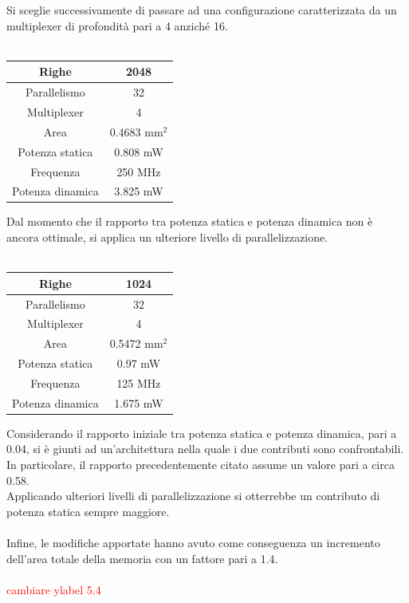 \documentclass[11pt,  english, makeidx, a4paper, titlepage, oneside]{book}
\begin{document}
\vspace{0.3cm}
Si sceglie successivamente di passare ad una configurazione caratterizzata da un multiplexer di profondità pari a 4 anziché 16.
\\\\
\begin{center}
	\begin{tabular}{|c|c|}
	\hline
	Righe & 2048\\
	\hline
	Parallelismo & 32\\
	\hline
	Multiplexer & 4\\
	\hline
	Area & 0.4683 mm$^2$\\
	\hline
	Potenza statica & 0.808 mW\\
	\hline
	Frequenza & 250 MHz\\
	\hline
	Potenza dinamica & 3.825 mW\\
	\hline
	\end{tabular}	
\end{center}
\vspace{0.3cm}
Dal momento che il rapporto tra potenza statica e potenza dinamica non è ancora ottimale, si applica un ulteriore livello di parallelizzazione.
\\\\
\begin{center}
	\begin{tabular}{|c|c|}
	\hline
	Righe & 1024\\
	\hline
	Parallelismo & 32\\
	\hline
	Multiplexer & 4\\
	\hline
	Area & 0.5472 mm$^2$\\
	\hline
	Potenza statica & 0.97 mW\\
	\hline
	Frequenza & 125 MHz\\
	\hline
	Potenza dinamica & 1.675 mW\\
	\hline
	\end{tabular}	
\end{center}
\vspace{0.3cm}
Considerando il rapporto iniziale tra potenza statica e potenza dinamica, pari a 0.04, si è giunti ad un'architettura nella quale i due contributi sono confrontabili. In particolare, il rapporto precedentemente citato assume un valore pari a circa 0.58.
\\
Applicando ulteriori livelli di parallelizzazione si otterrebbe un contributo di potenza statica sempre maggiore.
\\\\
Infine, le modifiche apportate hanno avuto come conseguenza un incremento dell'area totale della memoria con un fattore pari a 1.4.
\\\\
\textcolor{red}{
cambiare ylabel 5.4
}
\end{document}
